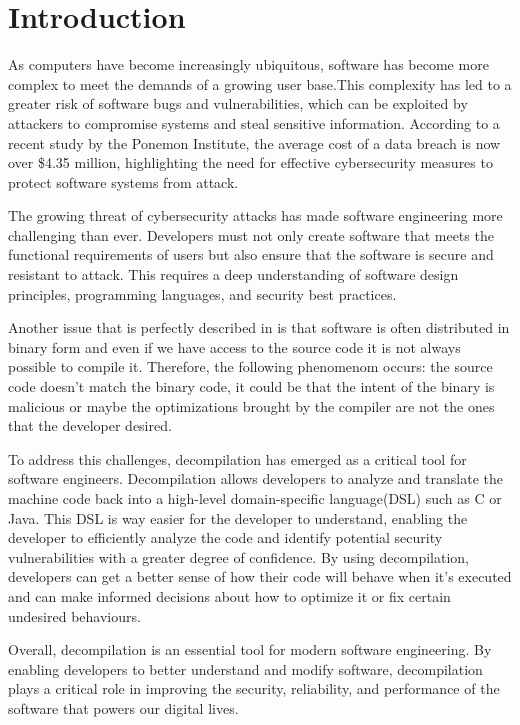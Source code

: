 \chapter{Introduction}\label{section:introduction}
\thispagestyle{pagestyle}

As computers have become increasingly ubiquitous, software has become more complex to meet the demands of a
growing user base.This complexity has led to a greater risk of software bugs and vulnerabilities, which 
can be exploited by attackers to compromise systems and steal sensitive information. According to a 
recent study by the Ponemon Institute\cite{ibmCostData}, the average cost of a data breach is now over \$4.35 million,
highlighting the need for effective cybersecurity measures to protect software systems from attack.

The growing threat of cybersecurity attacks has made software engineering more challenging than ever. 
Developers must not only create software that meets the functional requirements of users but also
ensure that the software is secure and resistant to attack. This requires a deep understanding of
software design principles, programming languages, and security best practices.

Another issue that is perfectly described in \cite{whatyousee} is that software is often distributed in
binary form and even if we have access to the source code it is not always possible to compile it.
Therefore, the following phenomenom occurs: the source code doesn't match the binary code, it could
be that the intent of the binary is malicious or maybe the optimizations brought by the compiler are
not the ones that the developer desired.

To address this challenges, decompilation has emerged as a critical tool for software engineers.
Decompilation allows developers to analyze and translate the machine code back into a high-level
domain-specific language(DSL) such as C or Java. This DSL is way easier for the developer to
understand, enabling the developer to efficiently analyze the code and identify potential security
vulnerabilities with a greater degree of confidence. By using decompilation, developers can
get a better sense of how their code will behave when it's executed and can make informed decisions
about how to optimize it or fix certain undesired behaviours.

Overall, decompilation is an essential tool for modern software engineering. By enabling developers
to better understand and modify software, decompilation plays a critical role in improving the
security, reliability, and performance of the software that powers our digital lives. 


